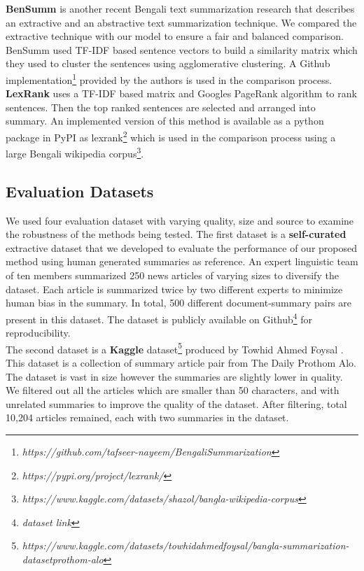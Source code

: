 \textbf{BenSumm} \cite{chowdhury-etal-2021-tfidf-clustering} is another recent Bengali text summarization research that describes an extractive and an abstractive text summarization technique. We compared the extractive technique with our model to ensure a fair and balanced comparison. BenSumm used TF-IDF based sentence vectors to build a similarity matrix which they used to cluster the sentences using agglomerative clustering. A Github implementation\footnote{\textit{https://github.com/tafseer-nayeem/BengaliSummarization}} provided by the authors is used in the comparison process.\\

\textbf{LexRank} \cite{Erkan-lexRank-2004} uses a TF-IDF based matrix and Googles PageRank algorithm \cite{page-PageRank-1999} to rank sentences. Then the top ranked sentences are selected and arranged into summary. An implemented version of this method is available as a python package in PyPI as lexrank\footnote{\textit{https://pypi.org/project/lexrank/}} which is used in the comparison process using a large Bengali wikipedia corpus\footnote{\textit{https://www.kaggle.com/datasets/shazol/bangla-wikipedia-corpus}}.

\subsection{Evaluation Datasets}\label{subsec:evaluation-datasets}
We used four evaluation dataset with varying quality, size and source to examine the robustness of the methods being tested. The first dataset is a \textbf{self-curated} extractive dataset that we developed to evaluate the performance of our proposed method using human generated summaries as reference. An expert linguistic team of ten members summarized 250 news articles of varying sizes to diversify the dataset. Each article is summarized twice by two different experts to minimize human bias in the summary. In total, 500 different document-summary pairs are present in this dataset. The dataset is publicly available on Github\footnote{\textit{dataset link}} for reproducibility.\\

The second dataset is a \textbf{Kaggle} dataset\footnote{\textit{https://www.kaggle.com/datasets/towhidahmedfoysal/bangla-summarization-datasetprothom-alo}} produced by Towhid Ahmed Foysal \cite{ahmed_2023_TAF_dataset}. This dataset is a collection of summary article pair from The Daily Prothom Alo. The dataset is vast in size however the summaries are slightly lower in quality. We filtered out all the articles which are smaller than 50 characters, and with unrelated summaries to improve the quality of the dataset. After filtering, total 10,204 articles remained, each with two summaries in the dataset.\\


